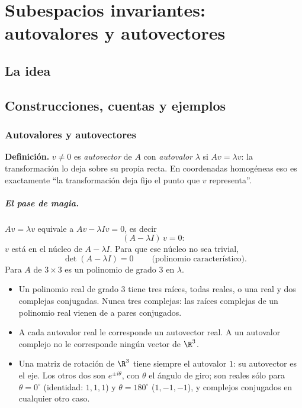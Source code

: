 \chapter{Subespacios invariantes: autovalores y autovectores}\label{cap:autovectores}

\section{La idea}

\section{Construcciones, cuentas y ejemplos}

\subsection{Autovalores y autovectores}\label{sec:autovalores}

{\small\vspace{1mm}\par}


\textbf{Definición.} \(v\neq0\) es \emph{autovector} de \(A\) con \emph{autovalor}
\(\lambda\) si \(Av=\lambda v\): la transformación lo deja sobre su propia recta. En
coordenadas homogéneas eso es exactamente ``la transformación deja fijo el punto que \(v\)
representa''.

\paragraph{El pase de magia.} \(Av=\lambda v\) equivale a \(Av-\lambda Iv=0\), es decir
\[
  (A-\lambda I)\,v=0 :
\]
\(v\) está en el núcleo de \(A-\lambda I\). Para que ese núcleo no sea trivial,
\[
  \boxed{\ \det(A-\lambda I)=0\ }\qquad\text{(polinomio característico)} .
\]
Para \(A\) de \(3\times3\) es un polinomio de grado \(3\) en \(\lambda\).

\begin{resultado}
\begin{itemize}
  \item Un polinomio real de grado \(3\) tiene tres raíces, todas reales, o una real y dos
  complejas conjugadas. Nunca tres complejas: las raíces complejas de un polinomio real
  vienen de a pares conjugados.
  \item A cada autovalor real le corresponde un autovector real. A un autovalor complejo no
  le corresponde ningún vector de \(\R^3\).
  \item Una matriz de rotación de \(\R^3\) tiene siempre el autovalor \(1\): su autovector es
  el eje. Los otros dos son \(e^{\pm i\theta}\), con \(\theta\) el ángulo de giro; son reales
  sólo para \(\theta=0^\circ\) (identidad: \(1,1,1\)) y \(\theta=180^\circ\) (\(1,-1,-1\)),
  y complejos conjugados en cualquier otro caso.
\end{itemize}
\end{resultado}

